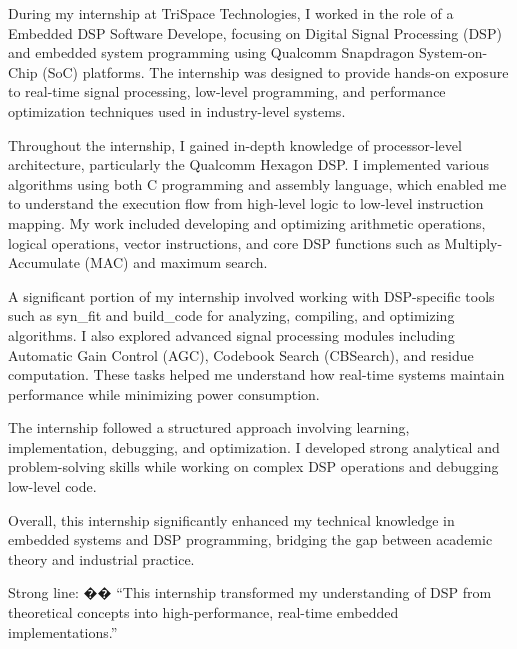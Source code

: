 \documentclass[12pt,a4paper]{report}
\begin{document}
\vspace{0.5cm}

During my internship at TriSpace Technologies, I worked in the role of a Embedded DSP Software Develope, focusing on Digital Signal Processing (DSP) and embedded system programming using Qualcomm Snapdragon System-on-Chip (SoC) platforms. The internship was designed to provide hands-on exposure to real-time signal processing, low-level programming, and performance optimization techniques used in industry-level systems.


Throughout the internship, I gained in-depth knowledge of processor-level architecture, particularly the Qualcomm Hexagon DSP. I implemented various algorithms using both C programming and assembly language, which enabled me to understand the execution flow from high-level logic to low-level instruction mapping. My work included developing and optimizing arithmetic operations, logical operations, vector instructions, and core DSP functions such as Multiply-Accumulate (MAC) and maximum search.


A significant portion of my internship involved working with DSP-specific tools such as syn\_fit and build\_code for analyzing, compiling, and optimizing algorithms. I also explored advanced signal processing modules including Automatic Gain Control (AGC), Codebook Search (CBSearch), and residue computation. These tasks helped me understand how real-time systems maintain performance while minimizing power consumption.


The internship followed a structured approach involving learning, implementation, debugging, and optimization. I developed strong analytical and problem-solving skills while working on complex DSP operations and debugging low-level code.


Overall, this internship significantly enhanced my technical knowledge in embedded systems and DSP programming, bridging the gap between academic theory and industrial practice.


Strong line: �� “This internship transformed my understanding of DSP from theoretical concepts into high-performance, real-time embedded implementations.”


\newpage
\tableofcontents

\newpage
\listoffigures
\end{document}
